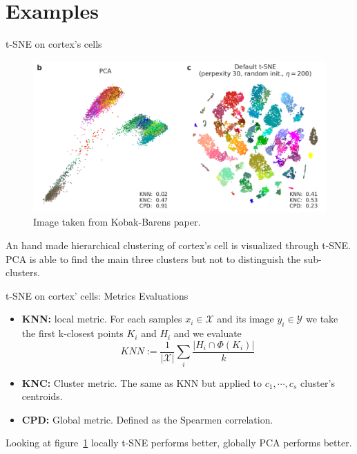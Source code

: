 \documentclass[10pt]{beamer}
\theoremstyle{definition}
\newcommand{\1}{\mathbbm{1}}
\newcommand{\XX}{\mathcal{X}}
\newcommand{\YY}{\mathcal{Y}}
\begin{document}
\section{Examples}
\begin{frame}{t-SNE on cortex's cells}
  \begin{figure}[h!]
    \centering
    \includegraphics[scale=0.27]{./pic/cells.png}
    \caption{Image taken from Kobak-Barens paper.}
    \label{cortex}
  \end{figure}
  An hand made hierarchical clustering of cortex's cell is visualized
  through t-SNE\@. PCA is able to find the main three clusters but not to
  distinguish the sub-clusters.
\end{frame}
\begin{frame}{t-SNE on cortex' cells: Metrics Evaluations}
  \begin{itemize}
    \item {\bf KNN:} local metric. For each samples $x_i\in\XX$ and its
      image $y_i\in\YY$ we take the first k-closest points $K_i$ and $H_i$
      and we evaluate
      \[
        KNN := \frac{1}{|\XX|}\sum_i \frac{|H_i\cap \Phi(K_i)|}{k}
      \]
    \item {\bf KNC:} Cluster metric. The same as KNN but applied to
      $c_1,\cdots,c_s$ cluster's centroids.
    \item {\bf CPD:} Global metric. Defined as the Spearmen
      correlation.
  \end{itemize}
  Looking at figure~\ref{cortex} locally t-SNE performs better, globally PCA
  performs better.
\end{frame}
\end{document}
